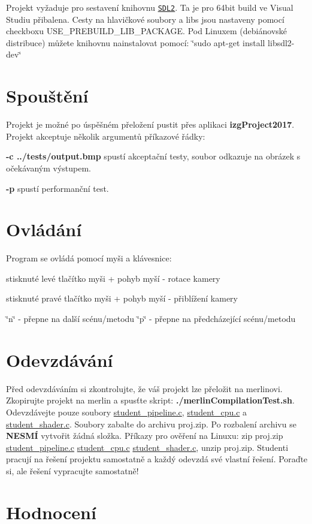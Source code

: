Projekt vyžaduje pro sestavení knihovnu \href{https://www.libsdl.org/download-2.0.php}{\tt S\-D\-L2}. Ta je pro 64bit build ve Visual Studiu přibalena. Cesty na hlavičkové soubory a libs jsou nastaveny pomocí checkboxu U\-S\-E\-\_\-\-P\-R\-E\-B\-U\-I\-L\-D\-\_\-\-L\-I\-B\-\_\-\-P\-A\-C\-K\-A\-G\-E. Pod Linuxem (debiánovské distribuce) můžete knihovnu nainstalovat pomocí\-: \char`\"{}sudo apt-\/get install libsdl2-\/dev\char`\"{}\hypertarget{index_spousteni}{}\section{Spouštění}\label{index_spousteni}
Projekt je možné po úspěšném přeložení pustit přes aplikaci {\bfseries izg\-Project2017}. Projekt akceptuje několik argumentů příkazové řádky\-:
\begin{DoxyItemize}
\item {\bfseries -\/c ../tests/output.bmp} spustí akceptační testy, soubor odkazuje na obrázek s očekávaným výstupem.
\item {\bfseries -\/p} spustí performanční test.
\end{DoxyItemize}\hypertarget{index_ovladani}{}\section{Ovládání}\label{index_ovladani}
Program se ovládá pomocí myši a klávesnice\-:
\begin{DoxyItemize}
\item stisknuté levé tlačítko myši + pohyb myší -\/ rotace kamery
\item stisknuté pravé tlačítko myši + pohyb myší -\/ přiblížení kamery
\item \char`\"{}n\char`\"{} -\/ přepne na další scénu/metodu \char`\"{}p\char`\"{} -\/ přepne na předcházející scénu/metodu
\end{DoxyItemize}\hypertarget{index_odevzdavani}{}\section{Odevzdávání}\label{index_odevzdavani}
Před odevzdáváním si zkontrolujte, že váš projekt lze přeložit na merlinovi. Zkopirujte projekt na merlin a spusťte skript\-: {\bfseries ./merlin\-Compilation\-Test.sh}. Odevzdávejte pouze soubory \hyperlink{student__pipeline_8c}{student\-\_\-pipeline.\-c}, \hyperlink{student__cpu_8c}{student\-\_\-cpu.\-c} a \hyperlink{student__shader_8c}{student\-\_\-shader.\-c}. Soubory zabalte do archivu proj.\-zip. Po rozbalení archivu se {\bfseries N\-E\-S\-MÍ} vytvořit žádná složka. Příkazy pro ověření na Linuxu\-: zip proj.\-zip \hyperlink{student__pipeline_8c}{student\-\_\-pipeline.\-c} \hyperlink{student__cpu_8c}{student\-\_\-cpu.\-c} \hyperlink{student__shader_8c}{student\-\_\-shader.\-c}, unzip proj.\-zip. Studenti pracují na řešení projektu samostatně a každý odevzdá své vlastní řešení. Poraďte si, ale řešení vypracujte samostatně!\hypertarget{index_hodnoceni}{}\section{Hodnocení}\label{index_hodnoceni}
